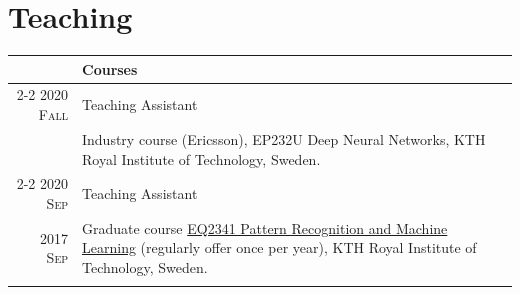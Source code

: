 \documentclass[a4paper,10pt]{article}
\begin{document}
\section{Teaching}
\begin{longtable}{r|p{13cm}}
  & \textbf{Courses} \\
  \cline{2-2}
  \textsc{2020 Fall} & Teaching Assistant \\
  & Industry course (Ericsson), {EP232U Deep Neural Networks}, KTH Royal Institute of Technology, Sweden.\\
  \cline{2-2}
  \textsc{2020 Sep}  & Teaching Assistant \\
  \textsc{2017 Sep}  & Graduate course \href{https://www.kth.se/student/kurser/kurs/EQ2341?l=en}{EQ2341 Pattern Recognition and Machine Learning} (regularly offer once per year), KTH Royal Institute of Technology, Sweden.\\
  \multicolumn{2}{c}{} \\


\end{longtable}
\end{document}

